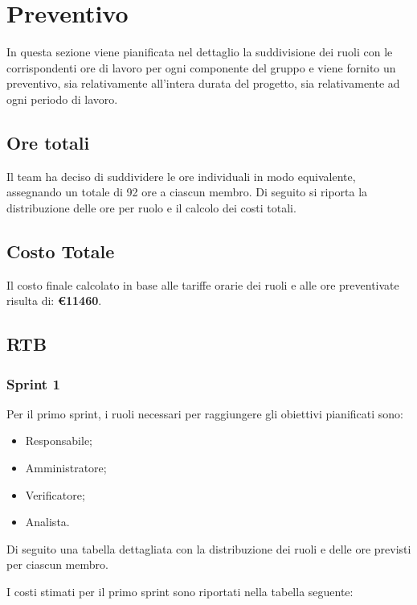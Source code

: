 \section{Preventivo}
In questa sezione viene pianificata nel dettaglio la suddivisione dei ruoli con
le corrispondenti ore di lavoro per ogni componente del gruppo e viene fornito
un preventivo, sia relativamente all'intera durata del progetto, sia
relativamente ad ogni periodo di lavoro.

\subsection{Ore totali}
Il team ha deciso di suddividere le ore individuali in modo equivalente,
assegnando un totale di 92 ore a ciascun membro. Di seguito si riporta la
distribuzione delle ore per ruolo e il calcolo dei costi totali.




\subsection{Costo Totale}
Il costo finale calcolato in base alle tariffe orarie dei ruoli e alle ore
preventivate risulta di: \textbf{\euro 11460}.

\subsection{RTB}

\subsubsection{Sprint 1}
Per il primo sprint, i ruoli necessari per raggiungere gli obiettivi
pianificati sono:
\begin{itemize}
    \item Responsabile;
    \item Amministratore;
    \item Verificatore;
    \item Analista.
\end{itemize}

\newpage
Di seguito una tabella dettagliata con la distribuzione dei ruoli e delle ore previsti per ciascun membro.




I costi stimati per il primo sprint sono riportati nella tabella seguente:

